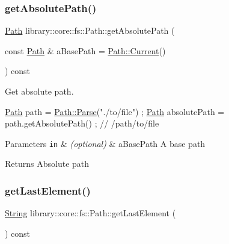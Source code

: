 \subsubsection{\texorpdfstring{get\+Absolute\+Path()}{getAbsolutePath()}}
{\footnotesize\ttfamily \hyperlink{classlibrary_1_1core_1_1fs_1_1_path}{Path} library\+::core\+::fs\+::\+Path\+::get\+Absolute\+Path (\begin{DoxyParamCaption}\item[{const \hyperlink{classlibrary_1_1core_1_1fs_1_1_path}{Path} \&}]{a\+Base\+Path = {\ttfamily \hyperlink{classlibrary_1_1core_1_1fs_1_1_path_adbdaa4e7ab2a1b399746782668863e53}{Path\+::\+Current}()} }\end{DoxyParamCaption}) const}



Get absolute path. 


\begin{DoxyCode}
\hyperlink{classlibrary_1_1core_1_1fs_1_1_path_aabc4240fc08479d1bff6b9753f2b5cc2}{Path} path = \hyperlink{classlibrary_1_1core_1_1fs_1_1_path_a6ba644b6609507e724c217bf2020f5ae}{Path::Parse}(\textcolor{stringliteral}{"./to/file"}) ;
\hyperlink{classlibrary_1_1core_1_1fs_1_1_path_aabc4240fc08479d1bff6b9753f2b5cc2}{Path} absolutePath = path.getAbsolutePath() ; \textcolor{comment}{// /path/to/file}
\end{DoxyCode}



\begin{DoxyParams}[1]{Parameters}
\mbox{\tt in}  & {\em (optional)} & a\+Base\+Path A base path \\
\hline
\end{DoxyParams}
\begin{DoxyReturn}{Returns}
Absolute path 
\end{DoxyReturn}
\mbox{\label{classlibrary_1_1core_1_1fs_1_1_path_a1beabf215fcc96dde591838556e00370}} 
\subsubsection{\texorpdfstring{get\+Last\+Element()}{getLastElement()}}
{\footnotesize\ttfamily \hyperlink{classlibrary_1_1core_1_1types_1_1_string}{String} library\+::core\+::fs\+::\+Path\+::get\+Last\+Element (\begin{DoxyParamCaption}{ }\end{DoxyParamCaption}) const}




